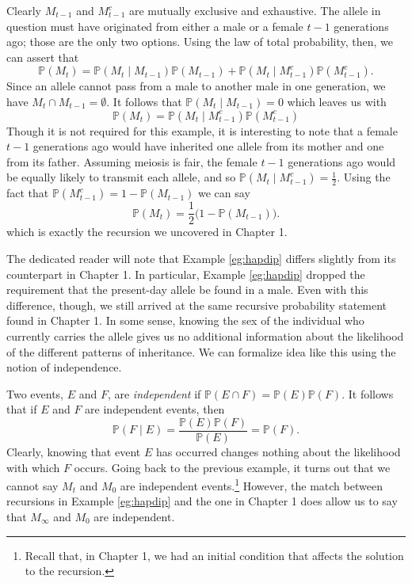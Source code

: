 \documentclass[../book.tex]{subfiles}
\begin{document}
\begin{solution}
Clearly \(M_{t-1}\) and \(M^c_{t-1}\) are mutually exclusive and exhaustive. The allele in question must have originated from either a male or a female \(t-1\) generations ago; those are the only two options. Using the law of total probability, then, we can assert that
\begin{equation}\label{eq:prob-16}
\mathbb{P} (M_t)
=
\mathbb{P}( M_t  \mid  M_{t-1} ) \mathbb{P} (M_{t-1})
+
\mathbb{P}( M_t  \mid  M_{t-1}^c ) \mathbb{P} (M_{t-1}^c).
\end{equation}
Since an allele cannot pass from a male to another male in one generation, we have \(M_t \cap M_{t-1} = \emptyset\). It follows that \(\mathbb{P}( M_t  \mid  M_{t-1} ) = 0\) which leaves us with
\begin{equation}\label{eq:prob-17}
\mathbb{P} (M_t)
=
\mathbb{P}( M_t  \mid  M_{t-1}^c ) \mathbb{P} (M_{t-1}^c)
\end{equation}
Though it is not required for this example, it is interesting to note that a female \(t-1\) generations ago would have inherited one allele from its mother and one from its father. Assuming meiosis is fair, the female \(t-1\) generations ago would be equally likely to transmit each allele, and so \(\mathbb{P}( M_t  \mid  M_{t-1}^c ) = \frac{1}{2}\). Using the fact that \(\mathbb{P} (M_{t-1}^c) = 1-\mathbb{P} (M_{t-1})\) we can say
\begin{equation}\label{eq:prob-18}
\mathbb{P} (M_t)
=
\frac{1}{2} \big(1-\mathbb{P} (M_{t-1})\big).
\end{equation}
which is exactly the recursion we uncovered in Chapter 1.
\end{solution}

The dedicated reader will note that Example \ref{eg:hapdip} differs slightly from its counterpart in Chapter 1. In particular, Example \ref{eg:hapdip} dropped the requirement that the present-day allele be found in a male. Even with this difference, though, we still arrived at the same recursive probability statement found in Chapter 1. In some sense, knowing the sex of the individual who currently carries the allele gives us no additional information about the likelihood of the different patterns of inheritance. We can formalize idea like this using the notion of independence.

Two events, \(E\) and \(F\), are \emph{independent} if \(\mathbb{P} (E \cap F) = \mathbb{P}(E)  \mathbb{P}(F)\). It follows that if \(E\) and \(F\) are independent events, then
\begin{equation}\label{eq:prob-19}
\mathbb{P}(F \mid E) = \frac{\mathbb{P}(E)  \mathbb{P}(F)}{\mathbb{P}(E)} = \mathbb{P}(F).
\end{equation}
Clearly, knowing that event \(E\) has occurred changes nothing about the likelihood with which \(F\) occurs. Going back to the previous example, it turns out that we cannot say \(M_t\) and \(M_0\) are independent events.\footnote{Recall that, in Chapter 1, we had an initial condition that affects the solution to the recursion.} However, the match between recursions in Example \ref{eg:hapdip} and the one in Chapter 1 does allow us to say that \(M_\infty\) and \(M_0\) are independent.
\end{document}
